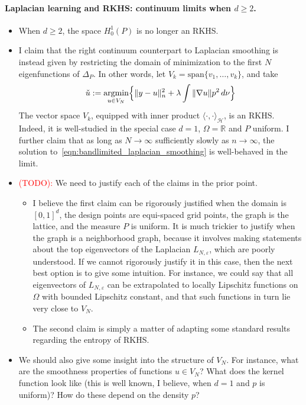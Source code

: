 \documentclass{article}
\newcommand{\Reals}{\mathbb{R}}
\newcommand{\1}{\mathbf{1}}
\DeclareMathOperator*{\argmin}{argmin}
\newcommand{\mc}[1]{\mathcal{#1}}
\newcommand{\dotp}[2]{\langle #1, #2 \rangle}
\theoremstyle{definition}
\theoremstyle{remark}
\begin{document}
\paragraph{Laplacian learning and RKHS: continuum limits when $d \geq 2$.}
\begin{itemize}
	\item When $d \geq 2$, the space $H_0^1(P)$ is no longer an RKHS.
	\item I claim that the right continuum counterpart to Laplacian smoothing is instead given by restricting the domain of minimization to the first $N$ eigenfunctions of $\Delta_P$. In other words, let $V_k = \mathrm{span}\{v_1,\ldots,v_k\}$, and take
	\begin{equation}
	\label{eqn:bandlimited_laplacian_smoothing}
	\check{u} := \argmin_{u \in V_N} \Bigl\{ \|y - u\|_n^2 + \lambda \int \|\nabla u\| p^2 \,d \nu  \Bigr\}
	\end{equation}
	The vector space $V_k$, equipped with inner product $\dotp{\cdot}{\cdot}_{\mc{H}}$, is an RKHS. Indeed, it is well-studied in the special case $d = 1$, $\Omega = \Reals$ and $P$ uniform. I further claim that as long as $N \to \infty$ sufficiently slowly as $n \to \infty$, the solution to~\eqref{eqn:bandlimited_laplacian_smoothing} is well-behaved in the limit.
	\item \textcolor{red}{(TODO):} We need to justify each of the claims in the prior point. 
	\begin{itemize}
		\item I believe the first claim can be rigorously justified when the domain is $[0,1]^d$, the design points are equi-spaced grid points, the graph is the lattice, and the measure $P$ is uniform. It is much trickier to justify when the graph is a neighborhood graph, because it involves making statements about the top eigenvectors of the Laplacian $L_{N,\varepsilon}$, which are poorly understood. If we cannot rigorously justify it in this case, then the next best option is to give some intuition. For instance, we could say that all eigenvectors of $L_{N,\varepsilon}$ can be extrapolated to locally Lipschitz functions on $\Omega$ with bounded Lipschitz constant, and that such functions in turn lie very close to $V_N$.
		\item The second claim is simply a matter of adapting some standard results regarding the entropy of RKHS.
	\end{itemize}
	\item We should also give some insight into the structure of $V_N$. For instance, what are the smoothness properties of functions $u \in V_N$? What does the kernel function look like (this is well known, I believe, when $d = 1$ and $p$ is uniform)? How do these depend on the density $p$?
\end{itemize}
\end{document}
